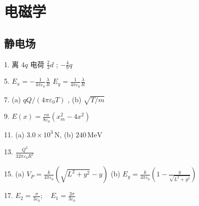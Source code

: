 
\part{电磁学}

\chapter{静电场}

\begin{oddanswers}
1. 离 $4q$ 电荷 $\frac{2}{3}d$ ; $-\frac{4}{9}q$

5. $E_x = -\frac{1}{4\pi\varepsilon_0} \frac{\lambda}{R}$
$E_y = \frac{1}{4\pi\varepsilon_0} \frac{\lambda}{R}$

7. (a) $qQ / (4\pi\varepsilon_0 T)$ , (b) $\sqrt{T/m}$

9. $E(x) = \frac{ea}{8\varepsilon_0} \left( x_m^2 - 4x^2 \right)$

11. (a) $3.0 \times 10^3\,\mathrm{N}$, (b) $240\,\mathrm{MeV}$

13. $\frac{Q^2}{32\pi\varepsilon_0 R^2}$

15. (a) $V_P = \frac{k}{4\pi\varepsilon_0} \left( \sqrt{L^2 + y^2} - y \right)$
(b) $E_y = \frac{k}{4\pi\varepsilon_0} \left( 1 - \frac{y}{\sqrt{L^2 + y^2}} \right)$

17. $E_2 = \frac{\sigma}{3\varepsilon_0} ; \quad E_1 = \frac{2\sigma}{3\varepsilon_0}$
\end{oddanswers}

